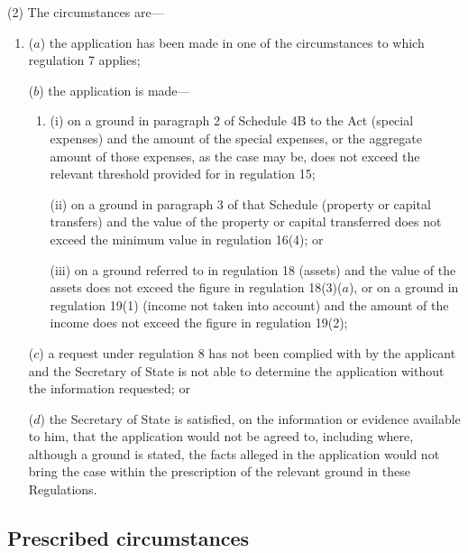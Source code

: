 \documentclass[12pt,a4paper]{article}
\begin{document}
(2) The circumstances are—
\begin{enumerate}\item[]
($a$) the application has been made in one of the circumstances to which regulation 7 applies;

($b$) the application is made—
\begin{enumerate}\item[]
(i) on a ground in paragraph 2 of Schedule 4B to the Act (special expenses) and the amount of the special expenses, or the aggregate amount of those expenses, as the case may be, does not exceed the relevant threshold provided for in regulation 15;

(ii) on a ground in paragraph 3 of that Schedule (property or capital transfers) and the value of the property or capital transferred does not exceed the minimum value in regulation 16(4); or

(iii) on a ground referred to in regulation 18 (assets) and the value of the assets does not exceed the figure in regulation 18(3)($a$), or on a ground in regulation 19(1) (income not taken into account) and the amount of the income does not exceed the figure in regulation 19(2);
\end{enumerate}

($c$) a request under regulation 8 has not been complied with by the applicant and the Secretary of State is not able to determine the application without the information requested; or

($d$) the Secretary of State is satisfied, on the information or evidence available to him, that the application would not be agreed to, including where, although a ground is stated, the facts alleged in the application would not bring the case within the prescription of the relevant ground in these Regulations.
\end{enumerate}

\subsection[7. Prescribed circumstances]{Prescribed circumstances}
\end{document}
